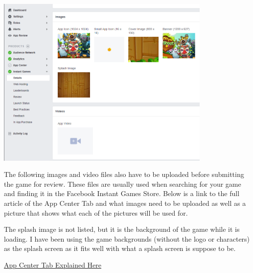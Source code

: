 \documentclass{article}
\begin{document}
\begin{center}
\includegraphics[width=400px]{images/instantdetails2.png}
\end{center}
The following images and video files also have to be uploaded before submitting the game for review. These files are usually used when searching for your game and finding it in the Facebook Instant Games Store. Below is a link to the full article of the App Center Tab and what images need to be uploaded as well as a picture that shows what each of the pictures will be used for. 

The splash image is not listed, but it is the background of the game while it is loading. I have been using the game backgrounds (without the logo or characters) as the splash screen as it fits well with what a splash screen is suppose to be.

\hyperlink{https://developers.facebook.com/docs/games/listing/}{App Center Tab Explained Here}
\end{document}

